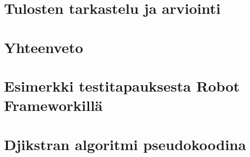 \documentclass[finnish, authoryear]{config/tauthesis}
\theoremstyle{definition}
\begin{document}
\chapter{Tulosten tarkastelu ja arviointi} \label{ch:12_tulosten_tarkastelu_ja_arviointi}
  
\chapter{Yhteenveto} \label{ch:13_yhteenveto}
  
\printbibliography[heading=bibintoc]

\begin{appendices}
\chapter{Esimerkki testitapauksesta Robot Frameworkillä} \label{ch:14_liite_robot_testitapaus}
  
\chapter{Djikstran algoritmi pseudokoodina} \label{ch:15_liite_djikstran_algoritmi}
  
\end{appendices}
\end{document}
